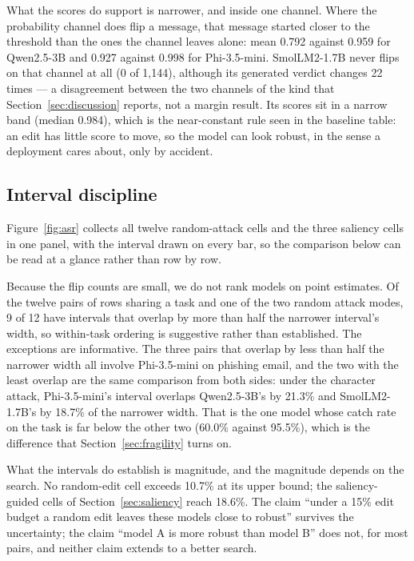 What the scores do support is narrower, and inside one channel. Where the
probability channel does flip a message, that message started closer to the
threshold than the ones the channel leaves alone: mean 0.792 against 0.959 for
Qwen2.5-3B and 0.927 against 0.998 for Phi-3.5-mini. SmolLM2-1.7B never flips on
that channel at all (0 of 1{,}144), although its generated verdict changes 22 times
--- a disagreement between the two channels of the kind that
Section~\ref{sec:discussion} reports, not a margin result. Its scores sit in a narrow band (median 0.984),
which is the near-constant rule seen in the baseline table: an edit has little
score to move, so the model can look robust, in the sense a deployment cares
about, only by accident.

\subsection{Interval discipline}

Figure~\ref{fig:asr} collects all twelve random-attack cells and the three
saliency cells in one panel, with the interval drawn on every bar, so the
comparison below can be read at a glance rather than row by row.

Because the flip counts are small, we do not rank models on point estimates. Of
the twelve pairs of rows sharing a task and one of the two random attack modes,
9 of 12 have intervals that overlap by more than half the narrower interval's
width, so
within-task ordering is suggestive rather than established. The exceptions are
informative. The three pairs that overlap by less than half the narrower width
all involve Phi-3.5-mini on phishing email, and the two with the least overlap
are the same comparison from both sides: under the character attack, Phi-3.5-mini's
interval overlaps Qwen2.5-3B's by 21.3\% and SmolLM2-1.7B's by 18.7\% of the
narrower width. That is the one model whose catch rate on the task is far below
the other two (60.0\% against 95.5\%), which is the difference that
Section~\ref{sec:fragility} turns on.

What the intervals do establish is magnitude, and the magnitude depends on the
search. No random-edit cell exceeds 10.7\% at its upper bound; the saliency-guided
cells of Section~\ref{sec:saliency} reach 18.6\%. The claim ``under a 15\% edit budget
a random edit leaves these models close to robust'' survives the uncertainty; the
claim ``model A is more robust than model B'' does not, for most pairs, and
neither claim extends to a better search.

